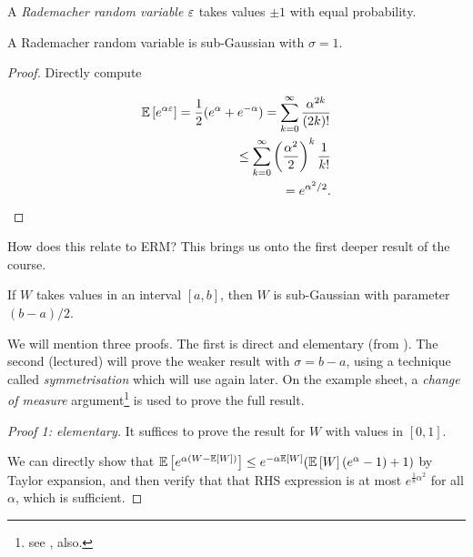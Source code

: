 \documentclass[11pt]{scrartcl}
\begin{document}
\begin{definition}
A \emph{Rademacher random variable} $\varepsilon$ takes values $\pm 1$ with equal probability.
\end{definition}

\begin{theorem}
A Rademacher random variable is sub-Gaussian with $\sigma=1$.

\begin{proof}
Directly compute

\begin{align*}
    \mathbb{E} \left[ e^{\alpha \varepsilon} \right] = \frac12(e^\alpha + e^{-\alpha}) = \sum_{k=0}^{\infty} \frac{\alpha^{2k}}{(2k)!} \\
    \le \sum_{k=0}^{\infty} \left(\frac{\alpha^2}{2} \right)^k \frac{1}{k!} \\
    = e^{\alpha^2 / 2}.
\end{align*}
\end{proof}
\end{theorem}


How does this relate to ERM? This brings us onto the first deeper result of the course.

\begin{theorem}
If $W$ takes values in an interval $[a,b]$, then $W$ is sub-Gaussian with parameter $(b-a)/2$.
\end{theorem}

We will mention three proofs. The first is direct and elementary (from \cite{HoeffdingExercise}). The second (lectured) will prove the weaker result with $\sigma = b-a$, using a technique called \emph{symmetrisation} which will use again later. On the example sheet, a \emph{change of measure} argument\footnote{see \cite{MIT Notes}, also.} is used to prove the full result.

\begin{proof}[Proof 1: elementary]
It suffices to prove the result for $W$ with values in $[0,1]$.

We can directly show that $\mathbb{E} \left[ e^{\alpha(W - \mathbb{E} \left[ W \right])} \right] \le e^{-\alpha \mathbb{E} \left[ W \right]} ( \mathbb{E} \left[ W \right](e^\alpha -1) + 1 )$ by Taylor expansion, and then verify that that RHS expression is at most $e^{\frac18 \alpha^2}$ for all $\alpha$, which is sufficient.
\end{proof}
\end{document}
